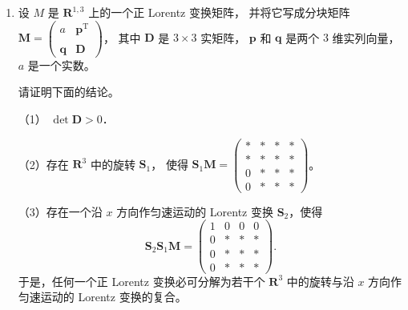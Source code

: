 \begin{enumerate}
    \item 设 $M$ 是 $\mathbf{R}^{1,3}$ 上的一个正 Lorentz 变换矩阵，
    并将它写成分块矩阵 $\boldsymbol{M}=\begin{pmatrix}a & \boldsymbol{p}^{\mathrm{T}} \\ \\ \boldsymbol{q} & \boldsymbol{D}\end{pmatrix}$，
    其中 $\boldsymbol{D}$ 是 $3 \times 3$ 实矩阵，
    $\boldsymbol{p}$ 和 $\boldsymbol{q}$ 是两个 $3$ 维实列向量，$a$ 是一个实数。
    
    请证明下面的结论。
    
    （1） $\det \boldsymbol{D}>0$．
    
    （2）存在 $\mathbf{R}^3$ 中的旋转 $\boldsymbol{S}_1$，
    使得 $\boldsymbol{S}_1 \boldsymbol{M}=\left(\begin{array}{cccc}* & * & * & * \\ * & * & * & * \\ 0 & * & * & * \\ 0 & * & * & *\end{array}\right)$。
    
    （3）存在一个沿 $x$ 方向作匀速运动的 Lorentz 变换 $\boldsymbol{S}_2$，使得
    $$\boldsymbol{S}_2 \boldsymbol{S}_1 \boldsymbol{M}
    =\begin{pmatrix}1 & 0 & 0 & 0 \\0 & * & * & * \\
    0 & * & * & * \\0 & * & * & *\end{pmatrix}.$$
    于是，任何一个正 Lorentz 变换必可分解为若干个 $\mathbf{R}^3$ 中的旋转与沿 $x$ 方向作匀速运动的 Lorentz 变换的复合。


\end{enumerate}
